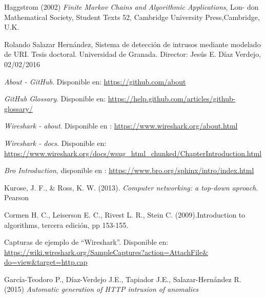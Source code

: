 \begin{thebibliography}{99}
Haggstrom (2002) \textit{Finite Markov Chains and Algorithmic Applications}, Lon-
don Mathematical Society, Student Texts 52, Cambridge University Press,Cambridge, U.K.

Rolando Salazar Hernández, Sistema de detección de intrusos mediante modelado de URI. Tesis doctoral. Universidad de Granada. Director: Jesús E. Díaz Verdejo, 02/02/2016

 \textit{About - GitHub}. Disponible en: \url{https://github.com/about}

 \textit{GitHub Glossary}. Disponible en: \url{https://help.github.com/articles/github-glossary/}

 \textit{Wireshark - about}. Disponible en : \url{https://www.wireshark.org/about.html}

 \textit{Wireshark - docs}. Disponible en: \url{https://www.wireshark.org/docs/wsug_html_chunked/ChapterIntroduction.html}

\textit{Bro Introduction}, disponible en : \url{https://www.bro.org/sphinx/intro/index.html}

Kurose, J. F., \& Ross, K. W. (2013). \textit{Computer networking: a top-down aproach}. Pearson

 Cormen H. C., Leiserson E. C., Rivest L. R., Stein C. (2009).Introduction to algorithms, tercera edición, pp 153-155.

 Capturas de ejemplo de “Wireshark”. Disponible en:  \url{https://wiki.wireshark.org/SampleCaptures?action=AttachFile&
do=view&target=http.cap}

 García-Teodoro P., Díaz-Verdejo J.E., Tapiador J.E., Salazar-Hernández R. (2015) \textit{Automatic generation of HTTP intrusion of anomalies}

\end{thebibliography}